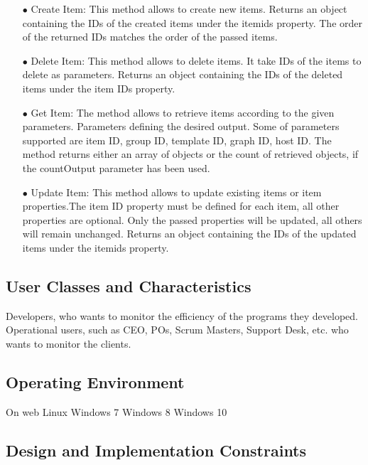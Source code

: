 \documentclass{article}
\begin{document}
\begin{itemize}
\item[$\bullet$]Create Item: This method allows to create new items. Returns an object containing the IDs of the created items under the itemids property. The order of the returned IDs matches the order of the passed items.

\item[$\bullet$]Delete Item: This method allows to delete items.  It take IDs of the items to delete as  parameters. Returns an object containing the IDs of the deleted items under the item IDs property.

\item[$\bullet$]Get Item: The method allows to retrieve items according to the given parameters. Parameters defining the desired output. Some of parameters supported are item ID, group ID, template ID, graph ID, host ID. The method returns either an array of objects or the count of retrieved objects, if the countOutput parameter has been used.

\item[$\bullet$]Update Item: This method allows to update existing items or item properties.The item ID property must be defined for each item, all other properties are optional. Only the passed properties will be updated, all others will remain unchanged. Returns an object containing the IDs of the updated items under the itemids property.


\end{itemize}



\subsection{User Classes and Characteristics}

Developers, who wants to monitor the efficiency of the programs they developed.
Operational users, such as CEO, POs, Scrum Masters, Support Desk, etc. who wants to monitor the clients.

\subsection{Operating Environment}

On web
Linux
Windows 7
Windows 8
Windows 10



\subsection{Design and Implementation Constraints}
\end{document}
